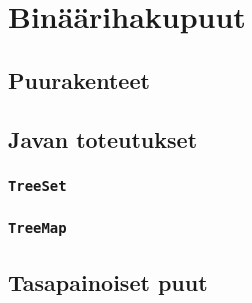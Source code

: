 \chapter{Binäärihakupuut}

\section{Puurakenteet}

\section{Javan toteutukset}

\subsection{\texttt{TreeSet}}

\subsection{\texttt{TreeMap}}

\section{Tasapainoiset puut}
